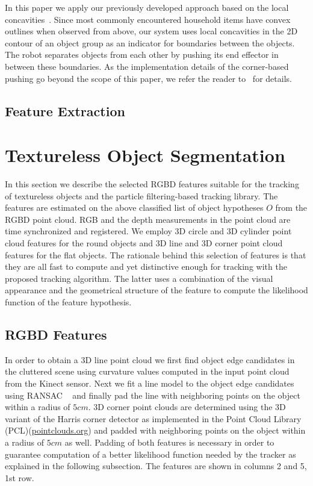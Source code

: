 In  this paper we apply our previously developed approach based on 
the local concavities~\cite{bersch12interactive}. Since most
commonly  encountered  household   items  have  convex  outlines  when
observed  from  above,  our  system  uses  local
concavities in the  2D contour of an object group  as an indicator for
boundaries between the objects.  The robot separates objects from each
other by pushing its end effector in between these boundaries. 
As the implementation details of the corner-based pushing go beyond the scope of 
this paper, we refer the reader to~\cite{bersch12interactive} for details.


\subsection{Feature Extraction}

\section{Textureless Object Segmentation}
\label{sec:textureless}
In this section we describe the selected RGBD features suitable for the 
tracking of textureless objects and the particle filtering-based tracking library. 
The features are estimated on the above classified list of object hypotheses $O$ from the RGBD point cloud. 
RGB and the depth measurements in the point cloud are time synchronized and registered.
We employ 3D circle and 3D cylinder point cloud features for 
the round objects and 3D line and 3D corner point cloud features for the flat
objects. The rationale behind this selection of features is that they are all fast to compute 
and yet distinctive enough for tracking with the proposed tracking algorithm. The latter
uses a combination of the visual appearance and the geometrical structure of the feature
to compute the likelihood function of the feature hypothesis.

\subsection{RGBD Features}
\label{sec:3dfeatures}
In order to obtain a 3D line point cloud we first find object edge candidates
in the cluttered scene using curvature values computed in the input
point cloud from the Kinect sensor. Next we fit a line model to the object edge
candidates using RANSAC ~\cite{ransac} and finally pad the line with neighboring
points on the object within a radius of $5cm$. 3D corner point clouds are
determined using the 3D variant of the Harris corner detector as implemented in the Point
Cloud Library (PCL)(\url{pointclouds.org}) and padded with neighboring
points on the object within a radius of $5cm$ as well. Padding of both
features is necessary in order to guarantee computation of a better
likelihood function needed by the tracker as explained in the following subsection.
The features are shown in %
columns 2 and 5, 1st row.

